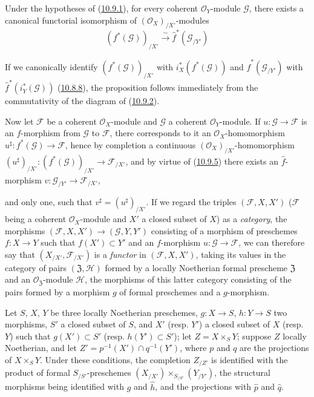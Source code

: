 \begin{proposition}[10.9.5]
\label{I.10.9.5}
Under the hypotheses of \textup{(\hyperref[I.10.9.1]{10.9.1})}, for every
coherent $\mathscr{O}_Y$-module $\mathscr{G}$, there exists a canonical
functorial isomorphism of $(\mathscr{O}_X)_{/X'}$-modules
\[
  (f^*(\mathscr{G}))_{/X'}\xrightarrow{\sim}
  \widehat f^*(\mathscr{G}_{/Y'})
\]
\end{proposition}

If we canonically identify $(f^*(\mathscr{G}))_{/X'}$ with
$i_X^*(f^*(\mathscr{G}))$ and $\widehat f^*(\mathscr{G}_{/Y'})$ with
$\widehat f^*(i_Y^*(\mathscr{G}))$
(\hyperref[I.10.8.8]{10.8.8}), the proposition follows immediately
from the commutativity of the diagram of
(\hyperref[I.10.9.2]{10.9.2}).

\begin{env}[10.9.6]
\label{I.10.9.6}
Now let $\mathscr{F}$ be a coherent $\mathscr{O}_X$-module and
$\mathscr{G}$ a coherent $\mathscr{O}_Y$-module. If
$u:\mathscr{G}\to\mathscr{F}$ is an $f$-morphism from $\mathscr{G}$ to
$\mathscr{F}$, there corresponds to it an $\mathscr{O}_X$-homomorphism
$u^\sharp:f^*(\mathscr{G})\to\mathscr{F}$, hence by completion a
continuous $(\mathscr{O}_X)_{/X'}$-homomorphism
$(u^\sharp)_{/X'}:(f^*(\mathscr{G}))_{/X'}\to\mathscr{F}_{/X'}$, and by
virtue of (\hyperref[I.10.9.5]{10.9.5}) there exists an
$\widehat f$-morphism $v:\mathscr{G}_{/Y'}\to\mathscr{F}_{/X'}$,

and only one, such that $v^\sharp=(u^\sharp)_{/X'}$. If we regard the
triples $(\mathscr{F},X,X')$ ($\mathscr{F}$ being a coherent
$\mathscr{O}_X$-module and $X'$ a closed subset of $X$) as
a \emph{category}, the morphisms
$(\mathscr{F},X,X')\to(\mathscr{G},Y,Y')$ consisting of a morphism of
preschemes $f:X\to Y$ such that $f(X')\subset Y'$ and an
$f$-morphism $u:\mathscr{G}\to\mathscr{F}$, we can therefore say that
$(X_{/X'},\mathscr{F}_{/X'})$ is a \emph{functor} in
$(\mathscr{F},X,X')$, taking its values in the category of pairs
$(\mathfrak{Z},\mathscr{H})$ formed by a locally Noetherian formal
prescheme $\mathfrak{Z}$ and an
$\mathscr{O}_{\mathfrak{Z}}$-module $\mathscr{H}$, the morphisms of
this latter category consisting of the pairs formed by a morphism
$g$ of formal preschemes and a $g$-morphism.
\end{env}

\begin{proposition}[10.9.7]
\label{I.10.9.7}
Let $S$, $X$, $Y$ be three locally Noetherian preschemes,
$g:X\to S$, $h:Y\to S$ two morphisms, $S'$ a closed subset of $S$,
and $X'$ \textup{(resp. $Y'$)} a closed subset of $X$ \textup{(resp. $Y$)} such that
$g(X')\subset S'$ \textup{(resp. $h(Y')\subset S'$)}; let
$Z=X\times_S Y$; suppose $Z$ locally Noetherian, and let
$Z'=p^{-1}(X')\cap q^{-1}(Y')$, where $p$ and $q$ are the projections of
$X\times_S Y$. Under these conditions, the completion $Z_{/Z'}$ is
identified with the product of formal $S_{/S'}$-preschemes
$(X_{/X'})\times_{S_{/S'}}(Y_{/Y'})$, the structural morphisms
being identified with $\widehat g$ and $\widehat h$, and the projections
with $\widehat p$ and $\widehat q$.
\end{proposition}

